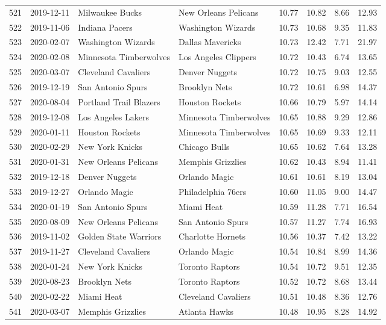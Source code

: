 \documentclass[
  11pt,
]{article}
\theoremstyle{nonumberplain}
\begin{document}
\begin{longtable}{rl|llr|rrr}
521 & 2019-12-11 & Milwaukee Bucks & New Orleans Pelicans & 10.77 & 10.82 & 8.66 & 12.93\\
522 & 2019-11-06 & Indiana Pacers & Washington Wizards & 10.73 & 10.68 & 9.35 & 11.83\\
523 & 2020-02-07 & Washington Wizards & Dallas Mavericks & 10.73 & 12.42 & 7.71 & 21.97\\
524 & 2020-02-08 & Minnesota Timberwolves & Los Angeles Clippers & 10.72 & 10.43 & 6.74 & 13.65\\
525 & 2020-03-07 & Cleveland Cavaliers & Denver Nuggets & 10.72 & 10.75 & 9.03 & 12.55\\
526 & 2019-12-19 & San Antonio Spurs & Brooklyn Nets & 10.72 & 10.61 & 6.98 & 14.37\\
527 & 2020-08-04 & Portland Trail Blazers & Houston Rockets & 10.66 & 10.79 & 5.97 & 14.14\\
528 & 2019-12-08 & Los Angeles Lakers & Minnesota Timberwolves & 10.65 & 10.88 & 9.29 & 12.86\\
529 & 2020-01-11 & Houston Rockets & Minnesota Timberwolves & 10.65 & 10.69 & 9.33 & 12.11\\
530 & 2020-02-29 & New York Knicks & Chicago Bulls & 10.65 & 10.62 & 7.64 & 13.28\\
531 & 2020-01-31 & New Orleans Pelicans & Memphis Grizzlies & 10.62 & 10.43 & 8.94 & 11.41\\
532 & 2019-12-18 & Denver Nuggets & Orlando Magic & 10.61 & 10.61 & 8.19 & 13.04\\
533 & 2019-12-27 & Orlando Magic & Philadelphia 76ers & 10.60 & 11.05 & 9.00 & 14.47\\
534 & 2020-01-19 & San Antonio Spurs & Miami Heat & 10.59 & 11.28 & 7.71 & 16.54\\
535 & 2020-08-09 & New Orleans Pelicans & San Antonio Spurs & 10.57 & 11.27 & 7.74 & 16.93\\
536 & 2019-11-02 & Golden State Warriors & Charlotte Hornets & 10.56 & 10.37 & 7.42 & 13.22\\
537 & 2019-11-27 & Cleveland Cavaliers & Orlando Magic & 10.54 & 10.84 & 8.99 & 14.36\\
538 & 2020-01-24 & New York Knicks & Toronto Raptors & 10.54 & 10.72 & 9.51 & 12.35\\
539 & 2020-08-23 & Brooklyn Nets & Toronto Raptors & 10.52 & 10.72 & 8.68 & 13.44\\
540 & 2020-02-22 & Miami Heat & Cleveland Cavaliers & 10.51 & 10.48 & 8.36 & 12.76\\
541 & 2020-03-07 & Memphis Grizzlies & Atlanta Hawks & 10.48 & 10.95 & 8.28 & 14.92\\

\end{longtable}
\end{document}
